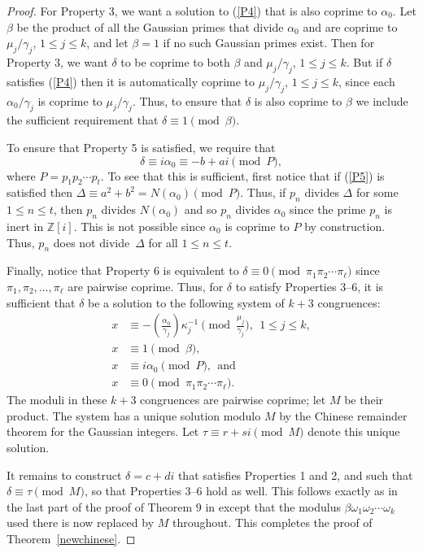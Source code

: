 \documentclass[11pt]{article}
\newcommand{\Z}{\mathbb{Z}}
\newcommand{\ao}{\alpha_0}
\newcommand{\zi}{\Z[i]}
\newcommand{\be}{\begin{equation}}
\newcommand{\ee}{\end{equation}}
\begin{document}
\begin{proof}
 For Property 3, we want a solution to (\ref{P4})  that is also 
  coprime to $\alpha_0$.  Let $\beta$ be the product of all the Gaussian primes that divide $\alpha_0$ and are coprime to $\mu_j/\gamma_j$, $1\leq j\leq k$, and  let $\beta=1$ if no such Gaussian primes exist.  
 Then for Property 3, we want $\delta$ to be coprime to both $\beta$ and 
 $\mu_j/\gamma_j$, $1\leq j\leq k$. But if $\delta$ satisfies (\ref{P4}) then it is automatically coprime to $\mu_j/\gamma_j$, $1\leq j\leq k$, since each $\ao/\gamma_j$ is coprime to $\mu_j/\gamma_j$. Thus, to ensure that $\delta$ is also coprime to $\beta$ we include the sufficient requirement that $\delta\equiv 1 \pmod\beta$.
 
 To ensure that Property 5 is satisfied, we require that 
 \be\label{P5}\delta\equiv i\alpha_0\equiv -b+ai\pmod P,\ee 
 where $P=p_1p_2\cdots p_t$. To see that this is sufficient, first notice that if (\ref{P5}) is satisfied then $\Delta\equiv a^2+b^2=N(\alpha_0)\pmod P$. Thus, if $p_n$ divides $\Delta$ for some $1\leq n\leq t$,
 then $p_n$ divides $N(\alpha_0)$ and so $p_n$ divides $\alpha_0$ since the prime $p_n$ is inert in $\zi$.  This is not possible since $\alpha_0$ is coprime to $P$ by construction.  Thus, $p_n $ does not divide~$\Delta$  for all $1 \leq n\leq t$.
 
 
 Finally,  notice that Property 6 is equivalent to $\delta\equiv 0\pmod{\pi_1\pi_2\cdots \pi_\ell}$ since $\pi_1,\pi_2,\ldots, \pi_\ell$ are pairwise coprime.
 Thus,  for $\delta$ to satisfy Properties 3--6,  it is sufficient that $\delta$  be a solution to the following system of $k+3$ congruences:
\begin{align*}\label{P3456}
x &\equiv -\left(\frac{\ao}{\gamma_j}\right)\kappa_j^{-1} \pmod{\frac{\mu_j}{\gamma_j}}, \ \ 1 \leq j\leq k,\\
x & \equiv 1\pmod\beta,\\
x&\equiv i\alpha_0\pmod P, \  \ {\text{and}} \\
x&\equiv 0\pmod{\pi_1\pi_2\cdots \pi_\ell}.
\end{align*}
The moduli in these $k+3$ congruences are pairwise coprime;  let $M$ be their product.  The system has a  unique solution 
 modulo $M$ by the Chinese remainder theorem for the Gaussian integers. Let $\tau\equiv r+si\pmod M$ denote this unique solution.  
 
 It remains to construct $\delta=c+di$ that satisfies  Properties 1 and 2, and such that $\delta\equiv\tau\pmod{M}$, so that Properties 3--6 hold as well.  This follows exactly as in the last part of the proof of Theorem 9 in \cite{magness} except that the modulus $\beta\omega_1\omega_2\cdots\omega_k$ used there is now replaced by $M$ throughout.  This completes the proof of Theorem~\ref{newchinese}.
\end{proof}
\end{document}
